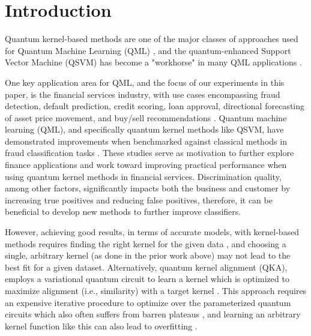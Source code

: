 \documentclass[reprint,amsfonts, amssymb, amsmath,  showkeys, nofootinbib,pra, superscriptaddress, twocolumn,longbibliography]{revtex4-2}
\begin{document}
\section{Introduction}

Quantum kernel-based methods are one of the major classes of approaches used for Quantum Machine Learning (QML) \cite{biamonte2017quantum}, and the quantum-enhanced Support Vector Machine (QSVM) \cite{havlivcek2019supervised} has become a "workhorse" in many QML applications \cite{Park2020practical,rebentrost2014quantum,peters2021machine,rastunkov2022boosting}.

One key application area for QML, and the focus of our experiments in this paper, is the financial services industry, with use cases encompassing fraud detection, default prediction, credit scoring, loan approval, directional forecasting of asset price movement, and buy/sell recommendations \cite{orus2019quantum,egger2020quantum,bouland2020prospects,herman2022survey}.
Quantum machine learning (QML), and specifically quantum kernel methods like QSVM, have demonstrated improvements when benchmarked against classical methods in fraud classification tasks \cite{grossi2022mixed, kyriienko2022unsupervised}. 
These studies serve as motivation to further explore finance applications and work toward improving practical performance when using quantum kernel methods in financial services.  
Discrimination quality, among other factors, significantly impacts both the business and customer by increasing true positives and reducing false positives, therefore, it can be beneficial to develop new methods to further improve classifiers.

However, achieving good results, in terms of accurate models, with kernel-based methods requires finding the right kernel for the given data \cite{scholkopf2002learning,kubler2021inductive,JMLR:v13:cortes12a}, and choosing a single, arbitrary kernel (as done in the prior work above) may not lead to the best fit for a given dataset.  Alternatively, quantum kernel alignment (QKA), employs a variational quantum circuit to learn a kernel which is optimized to maximize alignment (i.e., similarity) with a target kernel \cite{glick2021covariant}. This approach requires an expensive iterative procedure to optimize over the parameterized quantum circuits which also often suffers from barren plateaus \cite{thanasilp2022exponential,wang2021noise,Marrero2021,cerezo2021cost}, and learning an arbitrary kernel function like this can also lead to overfitting \cite{JMLR:v13:cortes12a}.
\end{document}
